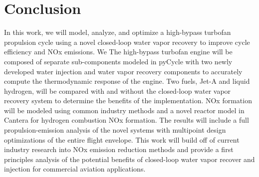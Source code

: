 \documentclass[conf]{new-aiaa}
\begin{document}
\section{Conclusion}
In this work, we will model, analyze, and optimize a high-bypass turbofan propulsion cycle using a novel closed-loop water vapor recovery to improve cycle efficiency and NOx emissions. We
The high-bypass turbofan engine will be composed of separate sub-components modeled in pyCycle with two newly developed water injection and water vapor recovery components to accurately compute the thermodynamic response of the engine.
Two fuels, Jet-A and liquid hydrogen, will be compared with and without the closed-loop water vapor recovery system to determine the benefits of the implementation.
NOx formation will be modeled using common industry methods and a novel reactor model in Cantera for hydrogen combustion NOx formation.
The results will include a full propulsion-emission analysis of the novel systems with multipoint design optimizations of the entire flight envelope.
This work will build off of current industry research into NOx emission reduction methods and provide a first principles analysis of the potential benefits of closed-loop water vapor recover and injection for commercial aviation applications.


\end{document}
